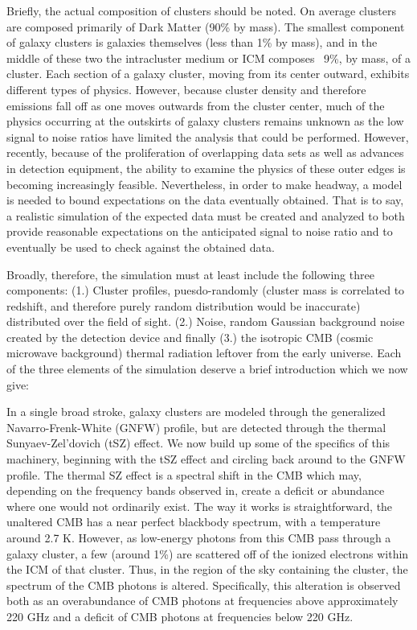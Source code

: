 \documentclass[12pt]{article} %
\begin{document}
Briefly, the actual composition of clusters should be noted. On average clusters are composed primarily of Dark Matter (90\% by mass). The smallest component of galaxy clusters is galaxies themselves (less than 1\% by mass), and in the middle of these two the intracluster medium or ICM composes ~9\%, by mass, of a cluster. Each section of a galaxy cluster, moving from its center outward, exhibits different types of physics. However, because cluster density and therefore emissions fall off as one moves outwards from the cluster center, much of the physics occurring at the outskirts of galaxy clusters remains unknown as the low signal to noise ratios have limited the analysis that could be performed. However, recently, because of the proliferation of overlapping data sets as well as advances in detection equipment, the ability to examine the physics of these outer edges is becoming increasingly feasible. Nevertheless, in order to make headway, a model is needed to bound expectations on the data eventually obtained. That is to say, a realistic simulation of the expected data must be created and analyzed to both provide reasonable expectations on the anticipated signal to noise ratio and to eventually be used to check against the obtained data. 

Broadly, therefore, the simulation must at least include the following three components: (1.) Cluster profiles, puesdo-randomly (cluster mass is correlated to redshift, and therefore purely random distribution would be inaccurate) distributed over the field of sight. (2.) Noise, random Gaussian background noise created by the detection device and finally (3.) the isotropic CMB (cosmic microwave background) thermal radiation leftover from the early universe. Each of the three elements of the simulation deserve a brief introduction which we now give: 

In a single broad stroke, galaxy clusters are modeled through the generalized Navarro-Frenk-White (GNFW) profile, but are detected through the thermal Sunyaev-Zel'dovich (tSZ) effect. We now build up some of the specifics of this machinery, beginning with the tSZ effect and circling back around to the GNFW profile. The thermal SZ effect is a spectral shift in the CMB which may, depending on the frequency bands observed in, create a deficit or abundance where one would not ordinarily exist. The way it works is straightforward, the  unaltered CMB has a near perfect blackbody spectrum, with a temperature around 2.7 K. However, as low-energy photons from this CMB pass through a galaxy cluster, a few (around 1\%) are scattered off of the ionized electrons within the ICM of that cluster. Thus, in the region of the sky containing the cluster, the spectrum of the CMB photons is altered. Specifically, this alteration is observed both as an overabundance of CMB photons at frequencies above approximately 220 GHz and a deficit of CMB photons at frequencies below 220 GHz. 
\end{document}
